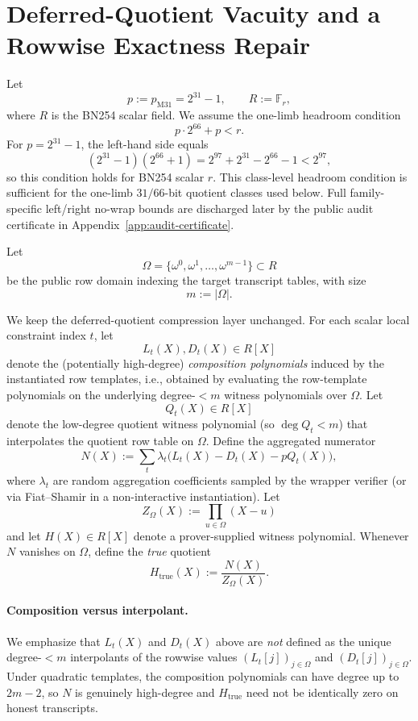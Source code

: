 ﻿\documentclass[11pt]{article}
\newcommand{\F}{\mathbb{F}}
\begin{document}
\section{Deferred-Quotient Vacuity and a Rowwise Exactness Repair}

Let
\[
p := p_{\mathrm{M31}} = 2^{31}-1,
\qquad
R := \F_r,
\]
where \(R\) is the BN254 scalar field. We assume the one-limb headroom condition
\[
p\cdot 2^{66}+p < r.
\]
For \(p=2^{31}-1\), the left-hand side equals
\[
(2^{31}-1)(2^{66}+1)=2^{97}+2^{31}-2^{66}-1<2^{97},
\]
so this condition holds for BN254 scalar \(r\). This class-level headroom
condition is sufficient for the one-limb \(31/66\)-bit quotient classes used
below. Full family-specific left/right no-wrap bounds are discharged later by
the public audit certificate in Appendix~\ref{app:audit-certificate}.

Let
\[
\Omega = \{\omega^0,\omega^1,\dots,\omega^{m-1}\} \subset R
\]
be the public row domain indexing the target transcript tables, with size
\[
m := |\Omega|.
\]

We keep the deferred-quotient compression layer unchanged. For each scalar local
constraint index \(t\), let
\[
L_t(X), D_t(X) \in R[X]
\]
denote the (potentially high-degree) \emph{composition polynomials} induced by
the instantiated row templates, i.e., obtained by evaluating the row-template
polynomials on the underlying degree-\(<m\) witness polynomials over \(\Omega\).
Let
\[
Q_t(X) \in R[X]
\]
denote the low-degree quotient witness polynomial (so \(\deg Q_t < m\)) that
interpolates the quotient row table on \(\Omega\). Define the aggregated
numerator
\[
N(X) := \sum_t \lambda_t\bigl(L_t(X)-D_t(X)-pQ_t(X)\bigr),
\]
where \(\lambda_t\) are random aggregation coefficients sampled by the wrapper
verifier (or via Fiat--Shamir in a non-interactive instantiation). Let
\[
Z_\Omega(X) := \prod_{u\in\Omega}(X-u)
\]
and let \(H(X)\in R[X]\) denote a prover-supplied witness polynomial. Whenever
\(N\) vanishes on \(\Omega\), define the \emph{true} quotient
\[
H_{\mathrm{true}}(X) := \frac{N(X)}{Z_\Omega(X)}.
\]

\paragraph{Composition versus interpolant.}
We emphasize that \(L_t(X)\) and \(D_t(X)\) above are \emph{not} defined as the
unique degree-\(<m\) interpolants of the rowwise values \((L_t[j])_{j\in\Omega}\)
and \((D_t[j])_{j\in\Omega}\). Under quadratic templates, the composition
polynomials can have degree up to \(2m-2\), so \(N\) is genuinely high-degree
and \(H_{\mathrm{true}}\) need not be identically zero on honest transcripts.
\end{document}
